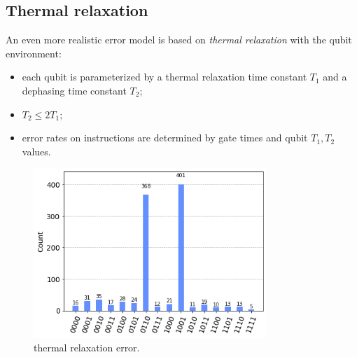 \documentclass{article}
\begin{document}
\subsection{Thermal relaxation}
An even more realistic error model is based on \emph{thermal relaxation} with
the qubit environment:
\begin{itemize}
  \item
  each qubit is parameterized by a thermal relaxation time constant $T_1$
  and a dephasing time constant $T_2$;
  \item
  $T_2 \leq 2T_1$;
  \item
 error rates on instructions are determined by gate times and qubit $T_1, T_2$
 values.
\end{itemize}
\begin{figure}[H]
  \centering
  \includegraphics[width=250pt]{Img/error-r.png}
  \caption{thermal relaxation error.}
\end{figure}
\end{document}
